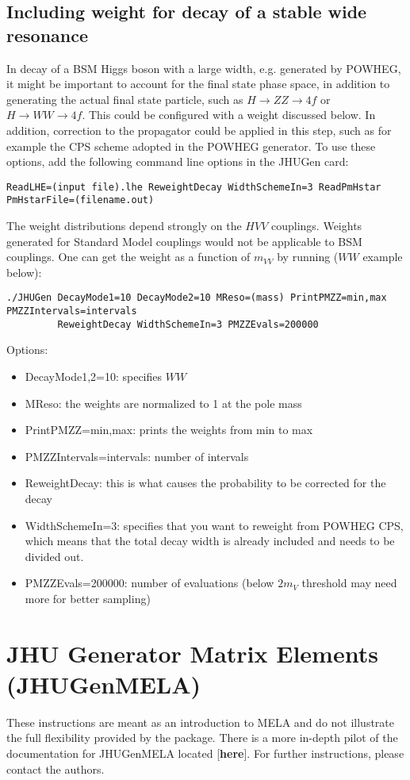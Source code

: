 \documentclass[aps,superscriptaddress,nofootinbib]{revtex4}
\begin{document}
\subsection{Including weight for decay of a stable wide resonance}
In decay of a BSM Higgs boson with a large width, e.g. generated by POWHEG, it might be important 
to account for the final state phase space, in addition to generating the actual final state particle,
such as $H\to ZZ\to 4f$ or $H\to WW\to 4f$. This could be configured with a weight discussed below. 
In addition, correction to the propagator could be applied in this step, such as for example the 
CPS scheme adopted in the POWHEG generator. To use these options, 
add the following command line options in the JHUGen card: 
\begin{verbatim}
ReadLHE=(input file).lhe ReweightDecay WidthSchemeIn=3 ReadPmHstar PmHstarFile=(filename.out)
\end{verbatim}
The weight distributions depend strongly on the $HVV$ couplings. 
Weights generated for Standard Model couplings would not be applicable to BSM couplings. 
One can get the weight as a function of $m_{VV}$ by running ($WW$ example below):
\begin{verbatim}
./JHUGen DecayMode1=10 DecayMode2=10 MReso=(mass) PrintPMZZ=min,max PMZZIntervals=intervals 
         ReweightDecay WidthSchemeIn=3 PMZZEvals=200000
\end{verbatim}
Options:
\begin{itemize}
\item DecayMode1,2=10: specifies $WW$
\item MReso: the weights are normalized to 1 at the pole mass
\item PrintPMZZ=min,max: prints the weights from min to max
\item PMZZIntervals=intervals: number of intervals
\item ReweightDecay: this is what causes the probability to be corrected for the decay
\item WidthSchemeIn=3: specifies that you want to reweight from POWHEG CPS, which means that the total decay width is already included and needs to be divided out.
\item PMZZEvals=200000: number of evaluations (below $2m_V$ threshold may need more for better sampling)
\end{itemize}

\section{JHU Generator Matrix Elements (JHUGenMELA)}
These instructions are meant as an introduction to MELA and do not illustrate the full flexibility provided by the package. There is a more in-depth pilot of the documentation for JHUGenMELA located \href{https://spin.pha.jhu.edu/MELA/}[\textbf{here}]. For further instructions, please contact the authors.
\end{document}

